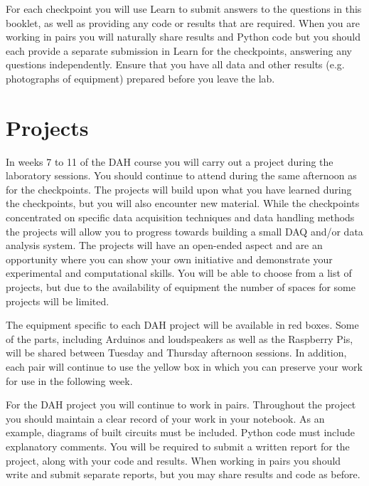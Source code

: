 For each checkpoint you will use Learn to submit answers to the questions in this booklet, as well as providing any code or results that are required.
When you are working in pairs you will naturally share results and Python code but you should each provide a separate submission in Learn for the checkpoints, answering any questions independently.
Ensure that you have all data and other results (e.g. photographs of equipment) prepared before you leave the lab.

\section{Projects}

In weeks 7 to 11 of the DAH course you will carry out a project during the laboratory sessions.
You should continue to attend during the same afternoon as for the checkpoints.
The projects will build upon what you have learned during the checkpoints, but you will also encounter new material.
While the checkpoints concentrated on specific data acquisition techniques and data handling methods the projects will allow you to progress towards building a small DAQ and/or data analysis system.
The projects will have an open-ended aspect and are an opportunity where you can show your own initiative and demonstrate your experimental and computational skills. 
You will be able to choose from a list of projects, but due to the availability of equipment the number of spaces for some projects will be limited.

The equipment specific to each DAH project will be available in red boxes.
Some of the parts, including Arduinos and loudspeakers as well as the Raspberry Pis, will be shared between Tuesday and Thursday afternoon sessions.
In addition, each pair will continue to use the yellow box in which you can preserve your work for use in the following week. 

For the DAH project you will continue to work in pairs.
Throughout the project you should maintain a clear record of your work in your notebook.
As an example, diagrams of built circuits must be included.
Python code must include explanatory comments.
You will be required to submit a written report for the project, along with your code and results.
When working in pairs you should write and submit separate reports, but you may share results and code as before.

